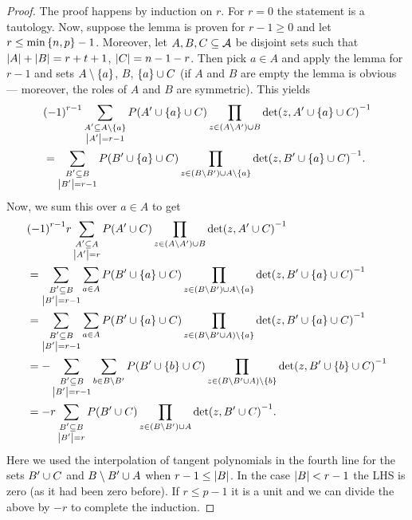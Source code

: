 \begin{proof}
    The proof happens by induction on $r$. For $r=0$ the statement is a
    tautology.
    Now, suppose the lemma is proven for $r-1\geq 0$ and let
    $r\leq\min\set{n,p}-1$.
    Moreover, let $A,B,C\subseteq \mathcal{A}$ be disjoint sets such
    that $\left\vert{A}\right\vert+\left\vert{B}\right\vert=r+t+1$, $\left\vert{C}\right\vert=n-1-r$. Then pick $a\in A$ and
    apply the lemma for $r-1$ and sets $A\setminus\set a$, $B$,
    $\set{a}\setjoin C$ (if $A$ and $B$ are empty the lemma is obvious --- moreover, the roles of $A$ and $B$ are symmetric).
    This yields
    \begin{align*}
        &{(-1)}^{r-1}\sum_{\substack{A'\setleq A\setminus\set a\\ \card{A'}=r-1}}{P(A'\setjoin\set a\setjoin C)\prod_{z\in (A\setminus A')\setjoin B}{{\det(z,A'\setjoin\set a\setjoin C)}^{-1}}}\\
        &= \sum_{\substack{B'\setleq B\\ \card{B'}=r-1}}{P(B'\setjoin\set a\setjoin C)\prod_{z\in (B\setminus B')\setjoin A\setminus\set a}{{\det(z,B'\setjoin\set a\setjoin C)}^{-1}}}\text{.}
    \end{align*}
    Now, we sum this over $a\in A$ to get
    \begin{align*}
        &{(-1)}^{r-1}r\sum_{\substack{A'\setleq A\\ \card{A'}=r}}{P(A'\setjoin C)\prod_{z\in (A\setminus A')\setjoin B}{{\det(z,A'\setjoin C)}^{-1}}}\\
        &= \sum_{\substack{B'\setleq B\\ \card{B'}=r-1}}{\sum_{a\in A}{P(B'\setjoin\set a\setjoin C)\prod_{z\in (B\setminus B')\setjoin A\setminus\set a}{{\det(z,B'\setjoin\set a\setjoin C)}^{-1}}}}\\
        &= \sum_{\substack{B'\setleq B\\ \card{B'}=r-1}}{\sum_{a\in A}{P(B'\setjoin\set a\setjoin C)\prod_{z\in (B\setminus B'\setjoin A)\setminus\set a}{{\det(z,B'\setjoin\set a\setjoin C)}^{-1}}}}\\
        &= -\sum_{\substack{B'\setleq B\\ \card{B'}=r-1}}{\sum_{b\in B\setminus B'}{P(B'\setjoin\set b\setjoin C)\prod_{z\in(B\setminus B'\setjoin A)\setminus\set b}{{\det(z,B'\setjoin\set b\setjoin C)}^{-1}}}}\\
        &= -r\sum_{\substack{B'\setleq B\\ \card{B'}=r}}{P(B'\setjoin C)\prod_{z\in (B\setminus B')\setjoin A}{{\det(z,B'\setjoin C)}^{-1}}}\text{.}
    \end{align*}
    Here we used the interpolation of tangent polynomials in the fourth
    line for the sets $B'\cup C$ and $B\setminus B'\cup A$ when
    $r-1\leq\left\vert{B}\right\vert$. In the case $\left\vert{B}\right\vert< r-1$ the LHS is zero (as it
    had been zero before).
    If $r\leq p-1$ it is a unit and we can divide the above by $-r$ to complete
    the induction.
\end{proof}

